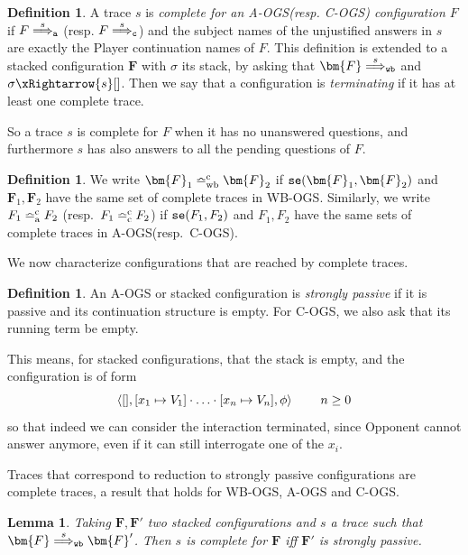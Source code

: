 \documentclass[11pt,a4paper]{amsart}
\theoremstyle{plain}
\theoremstyle{definition}
\theoremstyle{defC}
\theoremstyle{thmC}
\theoremstyle{plain}
\numberwithin{equation}{section}
\newcommand{\tr}{s}
\newcommand{\stt}{\sigma}
\newcommand{\AOGS}{\mbox{{\rm A-OGS}}\xspace}      %
\newcommand{\COGS}{\mbox{{\rm C-OGS}}\xspace}      %
\newcommand{\WBOGS}{\mbox{{\rm WB-OGS}}\xspace}      %
\newcommand{\okC}[2]{{\tt se}(#1,#2)}  %
\newcommand{\rmm}[1]{{\tt{\lowercase{#1}}}}
\newcommand{\genArr}[2]{\mathrel{\stackrel{{#1}}{\Longrightarrow}_{\rmm{\lowercase{#2}}}}}  %
\newcommand{\ArrA}[1]{\genArr{#1}{A}}  %
\newcommand{\ArrC}[1]{\genArr{#1}{C}}   %
\newcommand{\ArrWB}[1]{\genArr{#1}{WB}}          %
\newcommand{\genTEcomp}[1]{\mathrel{\bumpeq^{\rm c}_{\rm{\lowercase{#1}}}}} %
\newcommand{\TEwbc}{\genTEcomp{WB}}       %
\newcommand{\TEc}{\genTEcomp{A}}        %
\newcommand{\TEpc}{\genTEcomp{C}}        %
\newcommand{\FF}{F}
\newcommand{\FFb}{{\bm{\FF}}} %
\newcommand{\pmap}[2]{[#1 \mapsto #2]}
\newcommand{\conf}[1]{\langle #1\rangle}
\newcommand{\pshdsym}{\mathsf{pshd}}
\newcommand{\pshdTrans}[1]{\xRightarrow{#1}}%
\newcommand{\emptystack}{[]}
\theoremstyle{plain}
\newtheorem{lemma}[thm]{Lemma}
\theoremstyle{definition}
\newtheorem{definition}[thm]{Definition}
\begin{document}
\begin{definition}
\label{def:ctrace}
 A trace $\tr$ 
 is \emph{complete for an \AOGS (resp. \COGS) configuration $\FF$} if
 $\FF \ArrA{\tr}$ (resp. $\FF \ArrC{\tr}$) 
 and the subject names of the unjustified answers in $\tr$
 are exactly the Player continuation names of $\FF$.
 This definition is extended to a stacked configuration $\FFb$
 with $\stt$ its stack,
 by asking that $\FFb \ArrWB{\tr}$ and $\stt \pshdTrans{\tr} \emptystack$.
 Then we say that a configuration is \emph{terminating} 
 if it has at least one complete trace.
\end{definition}
\noindent
So a trace $\tr$ is complete for $\FF$ when it has no unanswered questions,
and furthermore $\tr$ has also answers to all the pending questions of $\FF$.


\begin{definition}
  \label{d:TEwbcN}
  We write $\FFb_1 \TEwbc \FFb_2$ if
  $\okC{\FFb_1}{\FFb_2}$
  and $\FFb_1,\FFb_2$ have the same set of complete traces in \WBOGS. 
%
  Similarly, we write $\FF_1 \TEc \FF_2$ (resp.\ $\FF_1 \TEpc \FF_2$)
  if $\okC{\FF_1}{\FF_2}$ 
  and $\FF_1,\FF_2$ have the same 
  sets of complete traces in \AOGS (resp.\ \COGS).
\end{definition} 

We now characterize configurations that are reached
by complete traces.

\begin{definition}
  \label{d:sp}
  An \AOGS or stacked configuration
  is \emph{strongly passive} if it is passive and its 
  continuation structure is empty.
  For \COGS, we also ask that its running term be empty.
\end{definition}
\noindent
This means, for stacked configurations,
that the stack is empty, and the configuration is of form
\[   
    \conf{\emptystack, 
      \pmap{x_1}{V_1}\cdot \ldots \cdot  \pmap{x_n}{V_n},\phi} \hskip .8cm n\geq 0 \]
so that indeed we can consider the interaction terminated, since Opponent
cannot answer anymore, even if it can still interrogate one of the $x_i$.

Traces that correspond to reduction to strongly passive configurations 
are complete traces, a result that holds for \WBOGS, \AOGS and \COGS.
  
\begin{lemma}
\label{l:WBOGS_complete-strongly-passive}
  Taking $\FFb,\FFb'$ two stacked configurations 
  and $\tr$ a trace such that $\FFb \ArrWB \tr \FFb'$.  
  Then $\tr$ is complete for $\FFb$
  iff $\FFb'$ is strongly passive.
\end{lemma}
\end{document}
